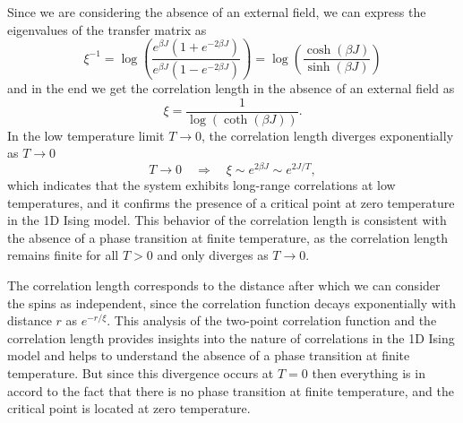 Since we are considering the absence of an external field, we can express the eigenvalues of the transfer matrix as
\[
    \xi^{-1} = \log \left( \frac{e^{\beta J}(1 + e^{-2\beta J})}{e^{\beta J}(1 - e^{-2\beta J})} \right) = \log \left( \frac{\cosh(\beta J)}{\sinh(\beta J)} \right)
\]
and in the end we get the correlation length in the absence of an external field as
\[
    \xi = \frac{1}{\log \left( \coth(\beta J) \right)}.
\]
In the low temperature limit \(T \to 0\), the correlation length diverges exponentially as \(T \to 0\)
\[
    T \to 0 \quad \Rightarrow \quad \xi \sim e^{2\beta J} \sim e^{2J/T},
\]
which indicates that the system exhibits long-range correlations at low temperatures, and it confirms the presence of a critical point at zero temperature in the 1D Ising model. This behavior of the correlation length is consistent with the absence of a phase transition at finite temperature, as the correlation length remains finite for all \(T > 0\) and only diverges as \(T \to 0\).

The correlation length corresponds to the distance after which we can consider the spins as independent, since the correlation function decays exponentially with distance \(r\) as \(e^{-r/\xi}\). This analysis of the two-point correlation function and the correlation length provides insights into the nature of correlations in the 1D Ising model and helps to understand the absence of a phase transition at finite temperature. But since this divergence occurs at \(T=0\) then everything is in accord to the fact that there is no phase transition at finite temperature, and the critical point is located at zero temperature.